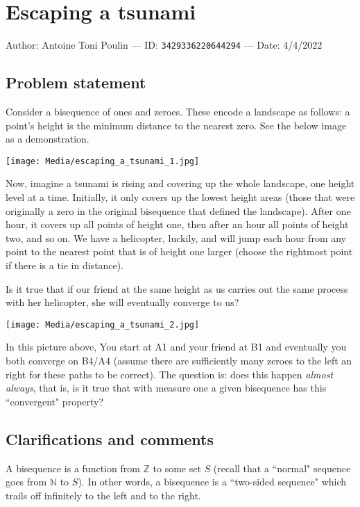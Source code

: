 
\section{Escaping a tsunami}

Author: Antoine Toni Poulin --- ID: \verb`3429336220644294` --- Date: 4/4/2022

\subsection{Problem statement}

Consider a bisequence of ones and zeroes. These encode a landscape as follows: a point's height is the minimum distance to the nearest zero. See the below image as a demonstration.

\texttt{[image: Media/escaping\_a\_tsunami\_1.jpg]}

Now, imagine a tsunami is rising and covering up the whole landscape, one height level at a time. Initially, it only covers up the lowest height areas (those that were originally a zero in the original bisequence that defined the landscape). After one hour, it covers up all points of height one, then after an hour all points of height two, and so on. We have a helicopter, luckily, and will jump each hour from any point to the nearest point that is of height one larger (choose the rightmost point if there is a tie in distance).

Is it true that if our friend at the same height as us carries out the same process with her helicopter, she will eventually converge to us?

\texttt{[image: Media/escaping\_a\_tsunami\_2.jpg]}

In this picture above, You start at A1 and your friend at B1 and eventually you both converge on B4/A4 (assume there are sufficiently many zeroes to the left an right for these paths to be correct). The question is: does this happen \textit{almost always}, that is, is it true that with measure one a given bisequence has this ``convergent" property?

\subsection{Clarifications and comments}

A bisequence is a function from $\mathbb{Z}$ to some set $S$ (recall that a ``normal" sequence goes from $\mathbb{N}$ to $S$). In other words, a bisequence is a ``two-sided sequence" which trails off infinitely to the left and to the right.

